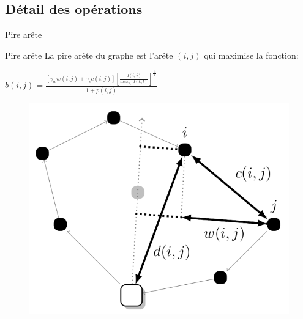 \documentclass{beamer}
\begin{document}
\subsection{Détail des opérations}

\begin{frame}{Pire arête}
\begin{exampleblock}{Pire arête}
La pire arête du graphe est l'arête $(i,j)$ qui maximise la fonction:
\begin{center}
$b(i,j) = \frac{[\gamma_w w(i,j) + \gamma_c c(i,j)] [\frac{d(i,j)}{max_{k,l}d(k,l)}] ^ {\frac{\gamma_d}{2}}}{1+p(i,j)}$
\end{center}
\end{exampleblock}

\begin{figure}
\centering
\includegraphics[scale=0.2]{metrics_big.png}
\end{figure}

\end{frame}
\end{document}
